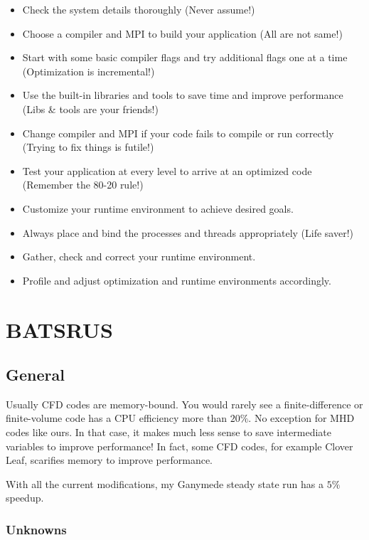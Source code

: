 \documentclass[11pt]{book} %
\begin{document}
\begin{itemize}
\item Check the system details thoroughly (Never assume!)
\item Choose a compiler and MPI to build your application (All are not same!)
\item Start with some basic compiler flags and try additional flags one at a time (Optimization is incremental!)
\item Use the built-in libraries and tools to save time and improve performance (Libs \& tools are your friends!)
\item Change compiler and MPI if your code fails to compile or run correctly (Trying to fix things is futile!)
\item Test your application at every level to arrive at an optimized code (Remember the 80-20 rule!)
\item Customize your runtime environment to achieve desired goals.
\item Always place and bind the processes and threads appropriately (Life saver!)
\item Gather, check and correct your runtime environment.
\item Profile and adjust optimization and runtime environments accordingly.
\end{itemize}

\chapter{BATSRUS}

\section{General}

Usually CFD codes are memory-bound. You would rarely see a finite-difference or finite-volume code has a CPU efficiency more than $20\%$. No exception for MHD codes like ours. In that case, it makes much less sense to save intermediate variables to improve performance! In fact, some CFD codes, for example Clover Leaf, scarifies memory to improve performance.

With all the current modifications, my Ganymede steady state run has a $5\%$ speedup.

\subsection{Unknowns}
\end{document}
